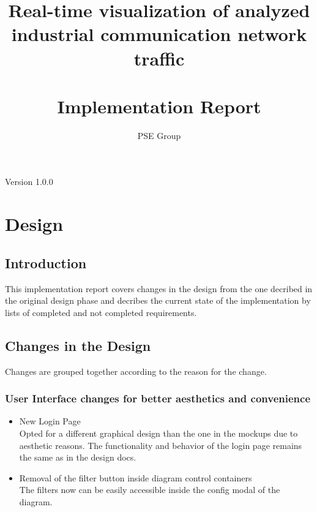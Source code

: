\documentclass[oneside, english, final]{design}
\author{PSE Group}
\title{Real-time visualization of analyzed industrial communication network traffic\\ \hfill \\Implementation Report}
\begin{document}
\nocite{*}

\setpdf

\maketitle


\hfill

\begin{center}
	\large{Version 1.0.0}
\end{center}


\thispagestyle{empty}
\begin{abstract}
	\thispagestyle{empty}
\end{abstract}

\thispagestyle{empty}
\newpage
\thispagestyle{empty}
\tableofcontents
\cleardoublepage
\setcounter{page}{1}


\section{Design}\label{sec:intro}
\subsection{Introduction}

This implementation report covers changes in the design from the one decribed in the original design phase
and decribes the current state of the implementation by lists of completed and not completed requirements.


\subsection{Changes in the Design}

Changes are grouped together according to the reason for the change.

\subsubsection{User Interface changes for better aesthetics and convenience}
\begin{itemize}
  \item{New Login Page
  \\
    Opted for a different graphical design than the one in the mockups due to aesthetic reasons. The functionality and behavior of the login page remains the same as in the design docs.}
    
  \item{Removal of the filter button inside diagram control containers
  \\
  The filters now can be easily accessible inside the config modal of the diagram.}
\end{itemize}
\end{document}
